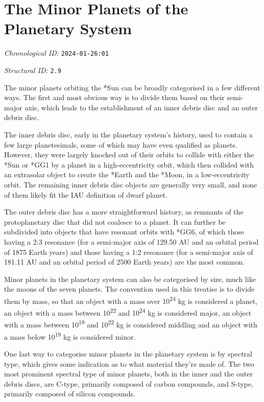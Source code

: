 \section{The Minor Planets of the Planetary System}
\emph{Chronological ID:} \texttt{2024-01-26:01}

\emph{Structural ID:} \texttt{2.9}

The minor planets orbiting the *Sun can be broadly categorised in a few different ways. The first and most obvious way is to divide them based on their semi-major axis, which leads to the establishment of an inner debris disc and an outer debris disc.

The inner debris disc, early in the planetary system's history, used to contain a few large planetesimals, some of which may have even qualified as planets. However, they were largely knocked out of their orbits to collide with either the *Sun or *GG1 by a planet in a high-eccentricity orbit, which then collided with an extrasolar object to create the *Earth and the *Moon, in a low-eccentricity orbit. The remaining inner debris disc objects are generally very small, and none of them likely fit the IAU definition of dwarf planet.

The outer debris disc has a more straightforward history, as remnants of the protoplanetary disc that did not coalesce to a planet. It can further be subdivided into objects that have resonant orbits with *GG6, of which those having a 2:3 resonance (for a semi-major axis of 129.50 AU and an orbital period of 1875 Earth years) and those having a 1:2 resonance (for a semi-major axis of 181.11 AU and an orbital period of 2500 Earth years) are the most common.

Minor planets in the planetary system can also be categorised by size, much like the moons of the seven planets. The convention used in this treatise is to divide them by mass, so that an object with a mass over 10\textsuperscript{24} kg is considered a planet, an object with a mass between 10\textsuperscript{22} and 10\textsuperscript{24} kg is considered major, an object with a mass between 10\textsuperscript{19} and 10\textsuperscript{22} kg is considered middling and an object with a mass below 10\textsuperscript{19} kg is considered minor.

One last way to categorise minor planets in the planetary system is by spectral type, which gives some indication as to what material they're made of. The two most prominent spectral type of minor planets, both in the inner and the outer debris discs, are C-type, primarily composed of carbon compounds, and S-type, primarily composed of silicon compounds.
\newpage
